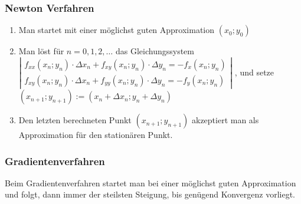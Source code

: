   \subsubsection{Newton Verfahren}
    \begin{enumerate}
      \item
        Man startet mit einer möglichst guten Approximation $(x_0;y_0)$\\
      \item
        Man löst für $n = 0,1,2,\ldots$ das Gleichungssystem\\
        $\left|\begin{matrix}
          f_{xx}(x_n;y_n)\cdot\Delta x_n + f_{xy}(x_n;y_n)\cdot\Delta y_n = -f_x(x_n;y_n) \\
          f_{xy}(x_n;y_n)\cdot\Delta x_n + f_{yy}(x_n;y_n)\cdot\Delta y_n = -f_y(x_n;y_n)
        \end{matrix}\right|$ , und setze $(x_{n+1};y_{n+1}) := (x_n +\Delta x_n; y_n + \Delta y_n)$\\
      \item
        Den letzten berechneten Punkt $(x_{n+1};y_{n+1})$ akzeptiert man als Approximation für den stationären Punkt.
    \end{enumerate}
    
  \subsubsection{Gradientenverfahren }
    Beim Gradientenverfahren startet man bei einer möglichst guten Approximation und folgt, dann immer der steilsten Steigung,
    bis genügend Konvergenz vorliegt.
    

